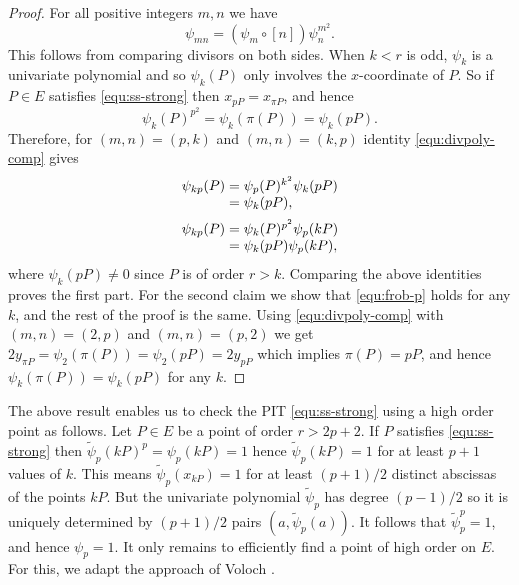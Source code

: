 \documentclass[12pt]{article}
\theoremstyle{plain}
\theoremstyle{definition}
\begin{document}
\begin{proof}
	For all positive integers $m, n$ we have
	\begin{equation}
	\label{equ:divpoly-comp}
		\psi_{mn} = (\psi_m \circ [n])\psi_n^{m^2}.
	\end{equation}
	This follows from comparing divisors on both sides. When $k < r$ is odd, $\psi_k$ is a 
	univariate polynomial and so $\psi_k(P)$ only involves the $x$-coordinate of $P$. So if $P \in 
	E$ satisfies \eqref{equ:ss-strong} then $x_{pP} = x_{\pi P}$, and hence 
	\begin{equation}
	\label{equ:frob-p}
		\psi_k(P)^{p^2} = \psi_k(\pi(P)) = \psi_k(pP).
	\end{equation}
	Therefore, for $(m, n) = (p, k)$ and $(m, n) = (k, p)$ identity \eqref{equ:divpoly-comp} gives
	\[
	\arraycolsep=1.4pt
	\begin{array}{rll}
		\psi_{kp}(P) & = & \psi_p(P)^{k^2} \psi_k(pP) \\
		& = & \psi_k(pP), \vspace*{2mm} \\		 
		\psi_{kp}(P) & = & \psi_k(P)^{p^2} \psi_p(kP) \\
		& = & \psi_k(pP) \psi_p(kP), \\
	\end{array}
	\]
	where $\psi_k(pP) \ne 0$ since $P$ is of order $r > k$. Comparing the above identities proves 
	the first part. For the second claim we show that \eqref{equ:frob-p} holds for any $k$, and the 
	rest of the proof is the same. Using \eqref{equ:divpoly-comp} with $(m, n) = (2, p)$ and $(m, 
	n) = (p, 2)$ we get $2y_{\pi P} = \psi_2(\pi(P)) = \psi_2(pP) = 2y_{pP}$ which implies $\pi(P) 
	= pP$, and hence $\psi_k(\pi(P)) = \psi_k(pP)$ for any $k$.
\end{proof}
The above result enables us to check the PIT \eqref{equ:ss-strong} using a high order point as 
follows. Let $P \in E$ be a point of order $r > 2p + 2$. If $P$ satisfies \eqref{equ:ss-strong} 
then $\tilde{\psi}_p(kP)^p = \psi_p(kP) = 1$ hence $\tilde{\psi}_p(kP) = 1$ for at least $p + 1$ 
values of $k$. This means $\tilde{\psi}_p(x_{kP}) = 1$ for at least $(p + 1) / 2$ distinct 
abscissas of the points $kP$. But the univariate polynomial $\tilde{\psi}_p$ has degree $(p - 1) / 
2$ so it is uniquely determined by $(p + 1) / 2$ pairs $(a, \tilde{\psi}_p(a))$. It follows that 
$\tilde{\psi}_p^p = 1$, and hence $\psi_p = 1$. It only remains to efficiently find a point of high 
order on $E$. For this, we adapt the approach of Voloch \cite{voloch2007,voloch2010}.
\end{document}
